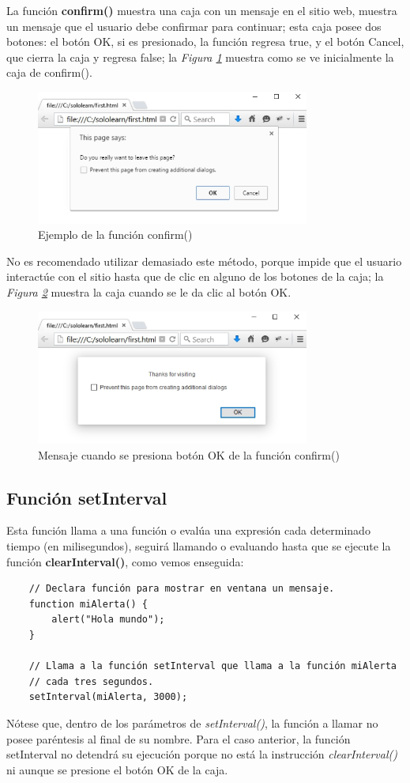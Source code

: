 La función \textbf{confirm()} muestra una caja con un mensaje en el sitio web, muestra un mensaje que el usuario debe confirmar para continuar; esta caja posee dos botones: el botón OK, si es presionado, la función regresa true, y el botón Cancel, que cierra la caja y regresa false; la \textit{Figura \ref{fig: 3}} muestra como se ve inicialmente la caja de confirm().
\begin{figure}[H]
    \caption{Ejemplo de la función confirm()}
    \label{fig: 3}
    \begin{center}
        \includegraphics [width=9cm]{ss/confirm.png}
    \end{center}
\end{figure}

No es recomendado utilizar demasiado este método, porque impide que el usuario interactúe con el sitio hasta que de clic en alguno de los botones de la caja; la \textit{Figura \ref{fig: 4}} muestra la caja cuando se le da clic al botón OK.
\begin{figure}[H]
    \caption{Mensaje cuando se presiona botón OK de la función confirm()}
    \label{fig: 4}
    \begin{center}
        \includegraphics [width=9cm]{ss/confirm_res.png}
    \end{center}
\end{figure}


\subsection{Función setInterval}

Esta función llama a una función o evalúa una expresión cada determinado tiempo (en milisegundos), seguirá llamando o evaluando hasta que se ejecute la función \textbf{clearInterval()}, como vemos enseguida:
\begin{lstlisting}
    // Declara función para mostrar en ventana un mensaje.
    function miAlerta() {
        alert("Hola mundo");
    }

    // Llama a la función setInterval que llama a la función miAlerta
    // cada tres segundos.
    setInterval(miAlerta, 3000);
\end{lstlisting}

Nótese que, dentro de los parámetros de \textit{setInterval()}, la función a llamar no posee paréntesis al final de su nombre. Para el caso anterior, la función setInterval no detendrá su ejecución porque no está la instrucción \textit{clearInterval()} ni aunque se presione el botón OK de la caja.
